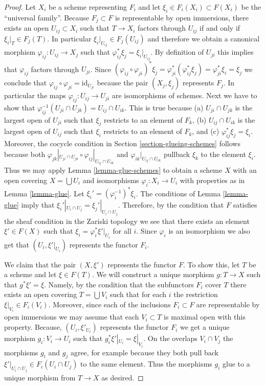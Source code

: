 \begin{proof}
Let $X_i$ be a scheme representing $F_i$ and let
$\xi_i \in F_i(X_i) \subset F(X_i)$ be the ``universal family''.
Because $F_j \subset F$ is representable by open immersions,
there exists an open $U_{ij} \subset X_i$ such that
$T \to X_i$ factors through $U_{ij}$ if and only if
$\xi_i|_T \in F_j(T)$. In particular
$\xi_i|_{U_{ij}} \in F_j(U_{ij})$ and therefore we obtain a
canonical morphism $\varphi_{ij} : U_{ij} \to X_j$ such that
$\varphi_{ij}^*\xi_j = \xi_i|_{U_{ij}}$. By definition of $U_{ji}$
this implies that $\varphi_{ij}$ factors through $U_{ji}$.
Since $(\varphi_{ij} \circ \varphi_{ji})^*\xi_j
=\varphi_{ji}^*(\varphi_{ij}^*\xi_j) =
\varphi_{ji}^*\xi_i = \xi_j$ we conclude that
$\varphi_{ij} \circ \varphi_{ji} = \text{id}_{U_{ji}}$
because the pair $(X_j, \xi_j)$ represents $F_j$.
In particular the maps $\varphi_{ij} : U_{ij} \to U_{ji}$
are isomorphisms of schemes.
Next we have to show that
$\varphi_{ij}^{-1}(U_{ji} \cap U_{jk}) = U_{ij} \cap U_{ik}$.
This is true because (a) $U_{ji} \cap U_{jk}$ is the largest
open of $U_{ji}$ such that $\xi_j$ restricts to an element
of $F_k$, (b) $U_{ij} \cap U_{ik}$ is the largest
open of $U_{ij}$ such that $\xi_i$ restricts to an element
of $F_k$, and (c) $\varphi_{ij}^*\xi_j = \xi_i$. Moreover,
the cocycle condition in Section \ref{section-glueing-schemes}
follows because both
$\varphi_{jk}|_{U_{ji} \cap U_{jk}} \circ
\varphi_{ij}|_{U_{ij} \cap U_{ik}}$ and
$\varphi_{ik}|_{U_{ij} \cap U_{ik}}$ pullback $\xi_k$
to the element $\xi_i$.
Thus we may apply Lemma \ref{lemma-glue-schemes}
to obtain a scheme $X$ with an open
covering $X = \bigcup U_i$ and isomorphisms $\varphi_i : X_i \to U_i$
with properties as in Lemma \ref{lemma-glue}.
Let $\xi_i' = (\varphi_i^{-1})^* \xi_i$.
The conditions of Lemma \ref{lemma-glue} imply that
$\xi_i'|_{U_i \cap U_j} = \xi_j'|_{U_i \cap U_j}$.
Therefore, by the condition that $F$ satisfies the sheaf
condition in the Zariski topology we see that
there exists an element $\xi' \in F(X)$ such that
$\xi_i = \varphi_i^*\xi'|_{U_i}$ for all $i$.
Since $\varphi_i$ is an isomorphism we also get that
$(U_i, \xi'|_{U_i})$ represents the functor $F_i$.

\medskip\noindent
We claim that the pair $(X, \xi')$ represents the functor $F$.
To show this, let $T$ be a scheme and let $\xi \in F(T)$.
We will construct a unique morphism $g : T \to X$ such that
$g^*\xi' = \xi$. Namely, by the condition that the subfunctors
$F_i$ cover $T$ there exists an open covering $T = \bigcup V_i$
such that for each $i$ the restriction $\xi|_{V_i} \in F_i(V_i)$.
Moreover, since each of the inclusions $F_i \subset F$ are representable
by open immersions we may assume that each $V_i \subset T$ is maximal
open with this property.
Because, $(U_i, \xi'_{U_i})$ represents the functor $F_i$ we
get a unique morphism $g_i : V_i \to U_i$ such that
$g_i^*\xi'|_{U_i} = \xi|_{V_i}$. On the overlaps $V_i \cap V_j$
the morphisms $g_i$ and $g_j$ agree, for example because they both
pull back $\xi'|_{U_i \cap U_j} \in F_i(U_i \cap U_j)$
to the same element. Thus the morphisms $g_i$ glue to a unique morphism
from $T \to X$ as desired.
\end{proof}

